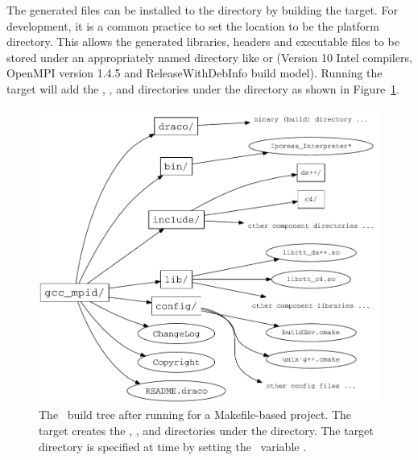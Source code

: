 The generated files can be installed to the  directory by building the  target.  For development, it is a common practice to set the  location to be the platform  directory.   This allows the generated libraries, headers and executable files to be stored under an appropriately named directory like  or  (Version 10 Intel compilers, OpenMPI version 1.4.5 and ReleaseWithDebInfo build model).  Running the  target will add the , ,  and  directories under the   directory as shown in Figure~\ref{fig:build_tree_post_install}.
\begin{figure}
  \centerline{\includegraphics[width=6in]{fig/build_tree_post_install}}
  \caption{The \draco\ build tree after running  for a Makefile-based project.  The  target creates  the , ,  and  directories under the   directory.  The target directory is specified at  time by setting the \cmake\ variable .}
  \label{fig:build_tree_post_install}
\end{figure}


